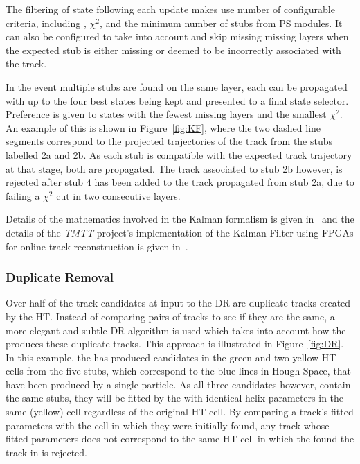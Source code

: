 The filtering of state following each update makes use number of configurable criteria, including \pT, $\chi^2$, and the minimum number of stubs from PS modules.
It can also be configured to take into account and skip missing missing layers when the expected stub is either missing or deemed to be incorrectly associated with the track.

In the event multiple stubs are found on the same layer, each can be propagated with up to the four best states being kept and presented to a final state selector.
Preference is given to states with the fewest missing layers and the smallest $\chi^2$.
An example of this is shown in Figure~\ref{fig:KF}, where the two dashed line segments correspond to the projected trajectories of the track from the stubs labelled 2a and 2b.
As each stub is compatible with the expected track trajectory at that stage, both are propagated.
The track associated to stub 2b however, is rejected after stub 4 has been added to the track propagated from stub 2a, due to failing a $\chi^2$ cut in two consecutive layers.

%
Details of the mathematics involved in the Kalman formalism is given in~\cite{Fruhwirth:1987fm} and the details of the \emph{TMTT} project's implementation of the Kalman Filter using FPGAs for online track reconstruction is given in~\cite{TMTT_JINST,SSummers}.

\subsubsection{Duplicate Removal}
Over half of the track candidates at input to the DR are duplicate tracks created by the HT.
Instead of comparing pairs of tracks to see if they are the same, a more elegant and subtle DR algorithm is used which takes into account how the \HT produces these duplicate tracks.
This approach is illustrated in Figure~\ref{fig:DR}.
In this example, the \HT has produced candidates in the green and two yellow HT cells from the five stubs, which correspond to the blue lines in Hough Space, that have been produced by a single particle.
As all three candidates however, contain the same stubs, they will be fitted by the \KF with identical helix parameters in the same (yellow) cell regardless of the original HT cell.
By comparing a track's fitted parameters with the \HT cell in which they were initially found, any track whose fitted parameters does not correspond to the same HT cell in which the \HT found the track in is rejected.

